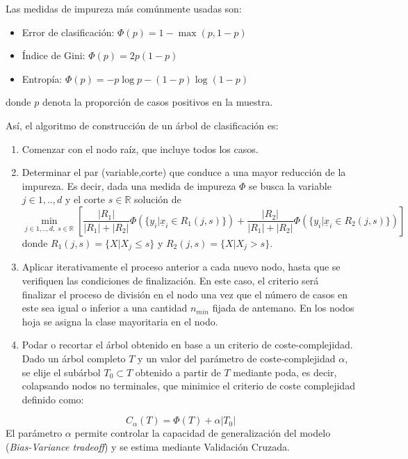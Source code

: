\documentclass[12pt,a4paper,]{book}
\numberwithin{dummy}{section}
\theoremstyle{ocrenumbox}
\theoremstyle{blacknumex}
\theoremstyle{blacknumbox}
\theoremstyle{ocrenum}
\theoremstyle{ocrenum}
\begin{document}
Las medidas de impureza más comúnmente usadas son:

\begin{itemize}
\item
  Error de clasificación: \(\Phi(p) = 1 - \max(p,1-p)\)
\item
  Índice de Gini: \(\Phi(p) = 2p(1-p)\)
\item
  Entropía: \(\Phi(p) = -p \log p - (1 - p) \log (1 - p)\)
\end{itemize}

donde \(p\) denota la proporción de casos positivos en la muestra.

Así, el algoritmo de construcción de un árbol de clasificación es:

\begin{enumerate}
\def\labelenumi{\arabic{enumi}.}
\item
  Comenzar con el nodo raíz, que incluye todos los casos.
\item
  Determinar el par (variable,corte) que conduce a una mayor reducción
  de la impureza. Es decir, dada una medida de impureza \(\Phi\) se
  busca la variable \(j \in {1,..,d}\) y el corte \(s \in \mathbb{R}\)
  solución de \[\min_{j \in {1,..,d},\;s \in \mathbb{R}}\left[ 
  \frac{|R_1|}{|R_1|+|R_2|} \Phi \left(\{y_i |\underline x_i \in R_1(j,s)\} \right)  + 
  \frac{|R_2|}{|R_1|+|R_2|} \Phi \left(\{y_i |\underline x_i \in R_2(j,s)\} \right)\right]\]
  donde \(R_1(j,s) = \{X | X_j \le s \}\) y
  \(R_2(j,s) = \{X | X_j > s \}\).
\item
  Aplicar iterativamente el proceso anterior a cada nuevo nodo, hasta
  que se verifiquen las condiciones de finalización. En este caso, el
  criterio será finalizar el proceso de división en el nodo una vez que
  el número de casos en este sea igual o inferior a una cantidad
  \(n_{min}\) fijada de antemano. En los nodos hoja se asigna la clase
  mayoritaria en el nodo.
\item
  Podar o recortar el árbol obtenido en base a un criterio de
  coste-complejidad. Dado un árbol completo \(T\) y un valor del
  parámetro de coste-complejidad \(\alpha\), se elije el subárbol
  \(T_0 \subset T\) obtenido a partir de \(T\) mediante poda, es decir,
  colapsando nodos no terminales, que minimice el criterio de coste
  complejidad definido como:
\end{enumerate}

\[C_{\alpha}(T) = \Phi(T) + \alpha|T_0|\] El parámetro \(\alpha\)
permite controlar la capacidad de generalización del modelo
(\emph{Bias-Variance tradeoff}) y se estima mediante Validación Cruzada.
\end{document}
